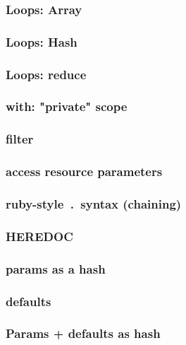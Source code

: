 \begin{frame}
    \frametitle{Loops: Array}
    \lstset{language=Puppet}
    \lstset{%
         basicstyle=\large,
     }
 
 \end{frame}
\begin{frame}
    \frametitle{Loops: Hash}
    \lstset{language=Puppet}
    \lstset{%
     }
 
 \end{frame}
\begin{frame}
    \frametitle{Loops: reduce}
    \lstset{language=Puppet}
    \lstset{%
     }
 
 \end{frame}
\begin{frame}
    \frametitle{with: "private" scope}
    \lstset{language=Puppet}
    \lstset{%
         basicstyle=\large,
     }
 
 \end{frame}
\begin{frame}
    \frametitle{filter}
    \lstset{language=Puppet}
    \lstset{%
     }
 
 \end{frame}
\begin{frame}
    \frametitle{access resource parameters}
    \lstset{language=Puppet}
    \lstset{%
     }
 
 \end{frame}
\begin{frame}
    \frametitle{ruby-style~.~syntax (chaining)}
    \lstset{language=Puppet}
    \lstset{%
     }
 
 \end{frame}
\begin{frame}
    \frametitle{HEREDOC}
    \lstset{language=Puppet}
    \lstset{%
     }
 
 \end{frame}
\begin{frame}
    \frametitle{params as a hash}
    \lstset{language=Puppet}
    \lstset{%
     }
 
 \end{frame}
\begin{frame}
    \frametitle{defaults}
    \lstset{language=Puppet}
    \lstset{%
     }
 
 \end{frame}
\begin{frame}
    \frametitle{Params + defaults as hash}
    \lstset{language=Puppet}
    \lstset{%
     }
 
 \end{frame}
